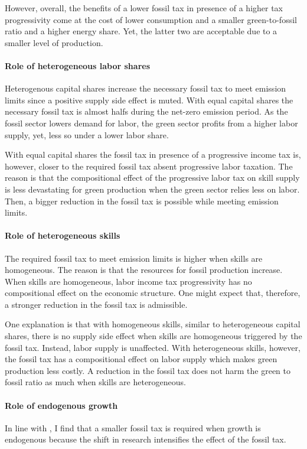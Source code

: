 However, overall, the benefits of a lower fossil tax in presence of a higher tax progressivity come at the cost of lower consumption and a smaller green-to-fossil ratio and a higher energy share. Yet, the latter two are acceptable due to a smaller level of production. 

\paragraph{Role of heterogeneous labor shares}
Heterogenous capital shares increase the necessary fossil tax to meet emission limits since a positive supply side effect is muted. 
With equal capital shares the necessary fossil tax is almost halfs during the net-zero emission period. 
As the fossil sector lowers demand for labor, the green sector profits from a higher labor supply, yet, less so under a lower labor share.  

With equal capital shares the fossil tax in presence of a progressive income tax is, however, closer to the required fossil tax absent progressive labor taxation.  The reason is that the compositional effect of the  progressive labor tax on skill supply is less devastating for green production when the green sector relies less on labor. Then, a bigger reduction in the fossil tax is possible while meeting emission limits. 

\paragraph{Role of heterogeneous skills}

The required fossil tax to meet emission limits is higher when skills are homogeneous. The reason is that the resources for fossil production increase.
When skills are homogeneous, labor income tax progressivity has no compositional effect on the economic structure. One might expect that, therefore, a stronger reduction in the fossil tax is admissible. 

One explanation is that with homogeneous skills, similar to heterogeneous capital shares, there is no supply side effect when skills are homogeneous triggered by the fossil tax. Instead, labor supply is unaffected. With heterogeneous skills, however, the fossil tax has a compositional effect on labor supply which makes green production less costly. A reduction in the fossil tax does not harm the green to fossil ratio as much when skills are heterogeneous. 

\paragraph{Role of endogenous growth}
In line with \cite{Fried2018ClimateAnalysis}, I find that a smaller fossil tax is required when growth is endogenous because the shift in research intensifies the effect of the fossil tax.  
